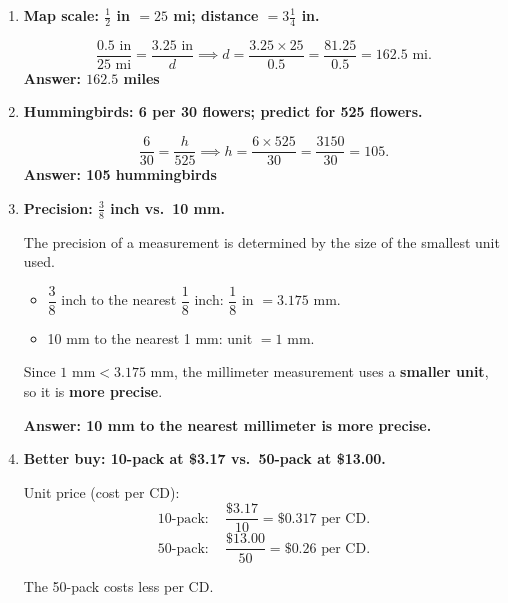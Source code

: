 \documentclass[11pt]{article}
\begin{document}
\begin{enumerate}[leftmargin=*, label=\textbf{\arabic*.}]
\vspace{0.3cm}
\item \textbf{Map scale: $\tfrac{1}{2}$ in $= 25$ mi; distance $= 3\tfrac{1}{4}$ in.}

  \[
    \frac{0.5 \text{ in}}{25 \text{ mi}} = \frac{3.25 \text{ in}}{d}
    \implies d = \frac{3.25 \times 25}{0.5} = \frac{81.25}{0.5} = 162.5 \text{ mi.}
  \]
  \textbf{Answer: $162.5$ miles}

\vspace{0.3cm}
\item \textbf{Hummingbirds: 6 per 30 flowers; predict for 525 flowers.}

  \[
    \frac{6}{30} = \frac{h}{525} \implies h = \frac{6 \times 525}{30} = \frac{3150}{30} = 105.
  \]
  \textbf{Answer: 105 hummingbirds}

\vspace{0.3cm}
\item \textbf{Precision: $\tfrac{3}{8}$ inch vs.\ 10 mm.}

  The precision of a measurement is determined by the size of the smallest unit used.

  \begin{itemize}
    \item $\dfrac{3}{8}$ inch to the nearest $\dfrac{1}{8}$ inch:
          $\dfrac{1}{8}$ in $= 3.175$ mm.
    \item 10 mm to the nearest 1 mm: unit $= 1$ mm.
  \end{itemize}

  Since $1 \text{ mm} < 3.175 \text{ mm}$, the millimeter measurement uses a
  \textbf{smaller unit}, so it is \textbf{more precise}.

  \textbf{Answer: 10 mm to the nearest millimeter is more precise.}

\vspace{0.3cm}
\item \textbf{Better buy: 10-pack at \$3.17 vs.\ 50-pack at \$13.00.}

  Unit price (cost per CD):
  \[
    10\text{-pack}: \quad \frac{\$3.17}{10} = \$0.317 \text{ per CD.}
  \]
  \[
    50\text{-pack}: \quad \frac{\$13.00}{50} = \$0.26 \text{ per CD.}
  \]

  The 50-pack costs less per CD.


\end{enumerate}
\end{document}
